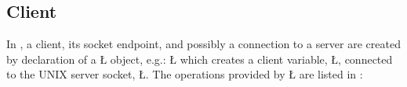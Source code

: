 \documentclass[openright,twoside]{report}
\begin{document}
\subsection{Client}

In \uC, a client, its socket endpoint, and possibly a connection to a server are created by declaration of a \LGinlinetrue\LGbegin\lgrinde\L{}\endlgrinde\LGend{} object, e.g.:
\LGinlinefalse\LGbegin\lgrinde
\L{}
\endlgrinde\LGend
which creates a client variable, \LGinlinetrue\LGbegin\lgrinde\L{}\endlgrinde\LGend{}, connected to the UNIX server socket, \LGinlinetrue\LGbegin\lgrinde\L{}\endlgrinde\LGend{}.
The operations provided by \LGinlinetrue\LGbegin\lgrinde\L{}\endlgrinde\LGend{} are listed in :
\end{document}
